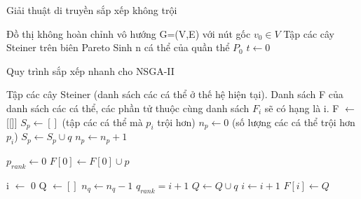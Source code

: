 \documentclass{hust}
\begin{document}
\begin{algorithm}[H]
	\caption{Giải thuật di truyền sắp xếp không trội}\label{alg:nsga_ii}
	\begin{algorithmic}[1]
		\Require Đồ thị không hoàn chỉnh vô hướng G=(V,E) với nút gốc $v_0 \in V$
		\Ensure Tập các cây Steiner trên biên Pareto
		\State Sinh n cá thể của quần thể $P_0$
		\EndFor
		\State $t\leftarrow 0$
		\EndWhile
	\end{algorithmic}
\end{algorithm}

\begin{algorithm}[H]
	\caption{Quy trình sắp xếp nhanh cho \gls{NSGA-II}}\label{alg:fast_non_dominated_sort}
	\begin{algorithmic}[1]
		\Require Tập các cây Steiner (danh sách các cá thể ở thế hệ hiện tại).
		\Ensure Danh sách F của danh sách các cá thể, các phần tử thuộc cùng danh sách $F_i$ sẽ có hạng là i.
		\State F $\leftarrow$ [[]]
			\State $S_p \leftarrow []$ (tập các cá thể mà $p_i$ trội hơn)
			\State $n_p \leftarrow 0$ (số lượng các cá thể trội hơn $p_i$)
					\State $S_p \leftarrow S_p \cup q$
				\Else
					\State $n_p \leftarrow n_p + 1$
				\EndIf
			\EndFor
			
				\State $p_{rank} \leftarrow 0$
				\State $F[0] \leftarrow F[0] \cup p$
			\EndIf
		\EndFor
		
		\State i $\leftarrow$ 0
			\State Q $\leftarrow []$
					$n_q \leftarrow n_q - 1$
						\State $q_{rank} = i+1$
						\State $Q \leftarrow Q \cup q$
					\EndIf
				\EndFor
			\EndFor
			\State $i \leftarrow i+1$
			\State $F[i] \leftarrow Q$
		\EndWhile
		
		
	\end{algorithmic}
\end{algorithm}
\end{document}
